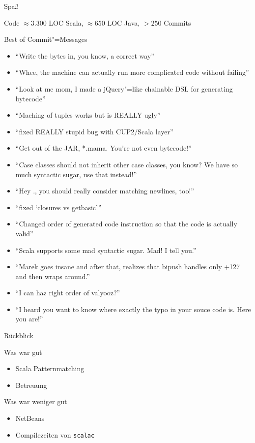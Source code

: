 \documentclass[hyperref={pdfpagelabels=false}]{beamer}
\begin{document}
\begin{frame}{Spaß}
  \begin{block}{Code}
    $\approx 3.300$ LOC Scala, $\approx 650$ LOC Java, $> 250$ Commits
  \end{block}
  \begin{block}{Best of Commit"=Messages}
    \begin{itemize}
      \item \enquote{Write the bytes in, you know, a correct way}
      \item \enquote{Whee, the machine can actually run more complicated code without failing}
      \item \enquote{Look at me mom, I made a jQuery"=like chainable DSL for generating bytecode}
      \item \enquote{Maching of tuples works but is REALLY ugly}
      \item \enquote{fixed REALLY stupid bug with CUP2/Scala layer}
      \item \enquote{Get out of the JAR, *.mama. You're not even bytecode!}
      \item \enquote{Case classes should not inherit other case classes, you know? We have so much syntactic sugar, use that instead!}
      \item \enquote{Hey ., you should really consider matching newlines, too!}
      \item \enquote{fixed \enquote{closures vs getbasic}}
      \item \enquote{Changed order of generated code instruction so that the code is actually valid}
      \item \enquote{Scala supports some mad syntactic sugar. Mad! I tell you.}
      \item \enquote{Marek goes insane and after that, realizes that bipush handles only +127 and then wraps around.}
      \item \enquote{I can haz right order of valyooz?}
      \item \enquote{I heard you want to know where exactly the typo in your souce code is. Here you are!}
    \end{itemize}
  \end{block}
\end{frame}

\begin{frame}{Rückblick}
  \begin{exampleblock}{Was war gut}
    \begin{itemize}
      \item Scala Patternmatching
      \item Betreuung \smiley
    \end{itemize}
  \end{exampleblock}
  \begin{alertblock}{Was war weniger gut}
    \begin{itemize}
      \item NetBeans
      \item Compilezeiten von \texttt{scalac}
    \end{itemize}
  \end{alertblock}
\end{frame}
\end{document}

